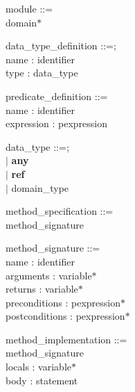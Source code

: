 \documentclass{paper}
\begin{document}
	\begin{tabbing}
 			module ::= \\
 			\indent domain$\ast$\\
	\end{tabbing}

	\begin{tabbing}
 			data\_type\_definition ::=; \\
 			\indent name : identifier \\
 			\indent type : data\_type \\
	\end{tabbing}

	\begin{tabbing}
 			predicate\_definition ::= \\
 			\indent name           : identifier \\
 			\indent expression     : pexpression \\
	\end{tabbing}

	\begin{tabbing}
 			data\_type ::=; \\
 			\indent $|$ \textbf{any}\\
 			\indent $|$ \textbf{ref}\\
 			\indent $|$ domain\_type\\
	\end{tabbing}
 			
	\begin{tabbing}
 			method\_specification ::= \\
 			\indent method\_signature \\
	\end{tabbing}
		
	\begin{tabbing}
 			method\_signature ::= \\
 			\indent name           : identifier \\
 			\indent arguments      : variable$\ast$ \\
 			\indent returns        : variable$\ast$ \\
 			\indent preconditions  : pexpression$\ast$ \\
 			\indent postconditions : pexpression$\ast$ \\
	\end{tabbing}

	\begin{tabbing}
 			method\_implementation ::= \\
 			\indent method\_signature \\
 			\indent locals         : variable$\ast$ \\
 			\indent body           : statement \\
	\end{tabbing}
\end{document}

